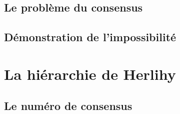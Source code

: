\documentclass[9pt]{beamer}
\begin{document}
\subsection{Le problème du consensus}







\subsection{Démonstration de l'impossibilité}







\section{La hiérarchie de Herlihy}

\subsection{Le numéro de consensus}






\end{document}

